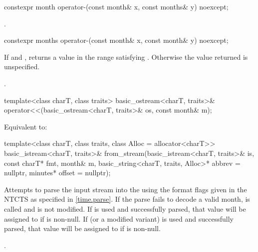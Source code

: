 %
\begin{itemdecl}
constexpr month operator-(const month& x, const months& y) noexcept;
\end{itemdecl}

\begin{itemdescr}
\pnum
\returns
{}.
\end{itemdescr}

%
\begin{itemdecl}
constexpr months operator-(const month& x, const month& y) noexcept;
\end{itemdecl}

\begin{itemdescr}
\pnum
\returns
If 
and ,
returns a value 
in the range 
satisfying .
Otherwise the value returned is unspecified.
\begin{example}
.
\end{example}
\end{itemdescr}

%
\begin{itemdecl}
template<class charT, class traits>
  basic_ostream<charT, traits>&
    operator<<(basic_ostream<charT, traits>& os, const month& m);
\end{itemdecl}

\begin{itemdescr}
\pnum
\effects
Equivalent to:
\end{itemdescr}

%
\begin{itemdecl}
template<class charT, class traits, class Alloc = allocator<charT>>
  basic_istream<charT, traits>&
    from_stream(basic_istream<charT, traits>& is, const charT* fmt,
                month& m, basic_string<charT, traits, Alloc>* abbrev = nullptr,
                minutes* offset = nullptr);
\end{itemdecl}

\begin{itemdescr}
\pnum
\effects
Attempts to parse the input stream 
into the   using
the format flags given in the NTCTS 
as specified in \ref{time.parse}.
If the parse fails to decode a valid month,
 is called and
 is not modified.
If  is used and successfully parsed,
that value will be assigned to  if  is non-null.
If  (or a modified variant) is used and successfully parsed,
that value will be assigned to  if  is non-null.

\pnum
\returns
{}.
\end{itemdescr}

